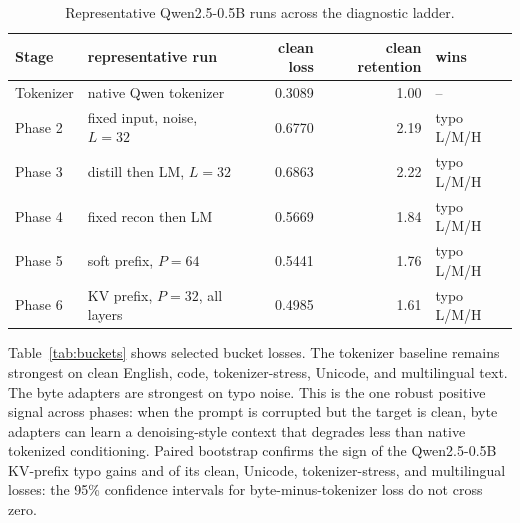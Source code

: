 \documentclass[runningheads]{llncs}
\newcommand{\qwen}{Qwen2.5-0.5B}
\begin{document}
\begin{table}[t]
\centering
\caption{Representative \qwen{} runs across the diagnostic ladder.}
\label{tab:main}
\small
\begin{tabular}{llrrl}
\toprule
Stage & representative run & clean loss & clean retention & wins \\
\midrule
Tokenizer & native Qwen tokenizer & 0.3089 & 1.00 & -- \\
Phase 2 & fixed input, noise, $L=32$ & 0.6770 & 2.19 & typo L/M/H \\
Phase 3 & distill then LM, $L=32$ & 0.6863 & 2.22 & typo L/M/H \\
Phase 4 & fixed recon then LM & 0.5669 & 1.84 & typo L/M/H \\
Phase 5 & soft prefix, $P=64$ & 0.5441 & 1.76 & typo L/M/H \\
Phase 6 & KV prefix, $P=32$, all layers & 0.4985 & 1.61 & typo L/M/H \\
\bottomrule
\end{tabular}
\end{table}

Table~\ref{tab:buckets} shows selected bucket losses. The tokenizer baseline remains strongest on clean English, code, tokenizer-stress, Unicode, and multilingual text. The byte adapters are strongest on typo noise. This is the one robust positive signal across phases: when the prompt is corrupted but the target is clean, byte adapters can learn a denoising-style context that degrades less than native tokenized conditioning. Paired bootstrap confirms the sign of the \qwen{} KV-prefix typo gains and of its clean, Unicode, tokenizer-stress, and multilingual losses: the 95\% confidence intervals for byte-minus-tokenizer loss do not cross zero.
\end{document}
